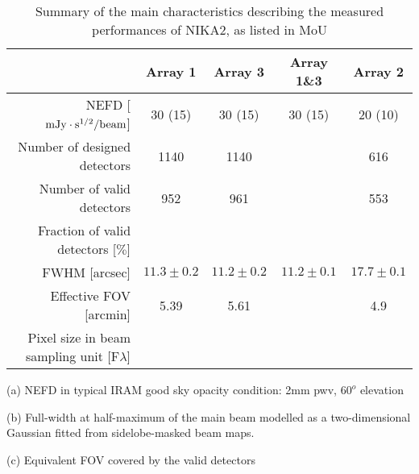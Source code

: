 \begin{table}[h]
  \caption{Summary of the main characteristics describing the measured performances of NIKA2, as listed in MoU}
  \label{nika2summary_main}
  \begin{threeparttable}
    \begin{tabular}{|r|c|c|c|c|}
      \hline
      & Array 1 & Array 3  & Array 1\&3 & Array 2 \\
      \hline
      \hline
      NEFD\tnote{a}\hspace{1mm}   [$\rm{mJy} \cdot \rm{s}^{1/2}/\rm{beam}$]  &  30 (15)   & 30 (15)  &  30 (15)  & 20 (10) \\
      Number of designed detectors       & 1140      &  1140    &    &    616  \\
      Number of valid detectors          &  952      &   961    &    &    553  \\
      Fraction of valid detectors [$\%$] &           &          &    &         \\
      \hline
      FWHM\tnote{b}\hspace{1mm} [arcsec]  &  $11.3 \pm 0.2$   &  $11.2 \pm 0.2$  &   $11.2 \pm 0.1$  &  $17.7 \pm 0.1$ \\
      \hline
      Effective FOV\tnote{c}\hspace{1mm} [arcmin]    &   5.39    &   5.61    &    &   4.9  \\
      \hline
      Pixel size in beam sampling unit [F$\lambda$]  &    &   &    &   \\
      \hline      
\end{tabular}
  \begin{tablenotes}
  \item[(a)] NEFD in typical IRAM good sky opacity condition: 2mm pwv, $60^o$ elevation
  \item[(b)] Full-width at half-maximum of the main beam modelled as a two-dimensional Gaussian fitted from sidelobe-masked beam maps.
  \item[(c)] Equivalent FOV covered by the valid detectors
    \end{tablenotes}
\end{threeparttable}
\end{table} 


